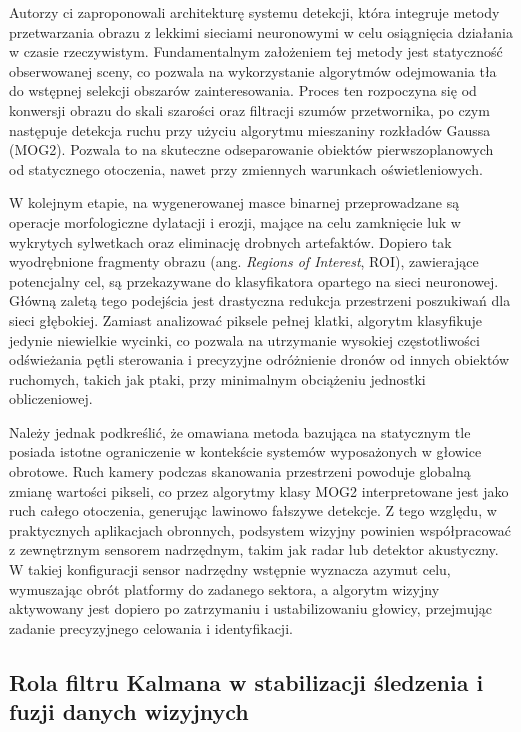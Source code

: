 \documentclass[a4paper,twoside,12pt]{book}
\begin{document}
Autorzy ci zaproponowali architekturę systemu detekcji, która integruje metody przetwarzania obrazu z lekkimi sieciami neuronowymi w celu osiągnięcia działania w czasie rzeczywistym. Fundamentalnym założeniem tej metody jest statyczność obserwowanej sceny, co pozwala na wykorzystanie algorytmów odejmowania tła do wstępnej selekcji obszarów zainteresowania. Proces ten rozpoczyna się od konwersji obrazu do skali szarości oraz filtracji szumów przetwornika, po czym następuje detekcja ruchu przy użyciu algorytmu mieszaniny rozkładów Gaussa (MOG2). Pozwala to na skuteczne odseparowanie obiektów pierwszoplanowych od statycznego otoczenia, nawet przy zmiennych warunkach oświetleniowych.

W kolejnym etapie, na wygenerowanej masce binarnej przeprowadzane są operacje morfologiczne dylatacji i erozji, mające na celu zamknięcie luk w wykrytych sylwetkach oraz eliminację drobnych artefaktów. Dopiero tak wyodrębnione fragmenty obrazu (ang. \textit{Regions of Interest}, ROI), zawierające potencjalny cel, są przekazywane do klasyfikatora opartego na sieci neuronowej. Główną zaletą tego podejścia jest drastyczna redukcja przestrzeni poszukiwań dla sieci głębokiej. Zamiast analizować piksele pełnej klatki, algorytm klasyfikuje jedynie niewielkie wycinki, co pozwala na utrzymanie wysokiej częstotliwości odświeżania pętli sterowania i precyzyjne odróżnienie dronów od innych obiektów ruchomych, takich jak ptaki, przy minimalnym obciążeniu jednostki obliczeniowej.

Należy jednak podkreślić, że omawiana metoda bazująca na statycznym tle posiada istotne ograniczenie w kontekście systemów wyposażonych w głowice obrotowe. Ruch kamery podczas skanowania przestrzeni powoduje globalną zmianę wartości pikseli, co przez algorytmy klasy MOG2 interpretowane jest jako ruch całego otoczenia, generując lawinowo fałszywe detekcje. Z tego względu, w praktycznych aplikacjach obronnych, podsystem wizyjny powinien współpracować z zewnętrznym sensorem nadrzędnym, takim jak radar lub detektor akustyczny. W takiej konfiguracji sensor nadrzędny wstępnie wyznacza azymut celu, wymuszając obrót platformy do zadanego sektora, a algorytm wizyjny aktywowany jest dopiero po zatrzymaniu i ustabilizowaniu głowicy, przejmując zadanie precyzyjnego celowania i identyfikacji.


\subsection*{Rola filtru Kalmana w stabilizacji śledzenia i fuzji danych wizyjnych}
\end{document}
